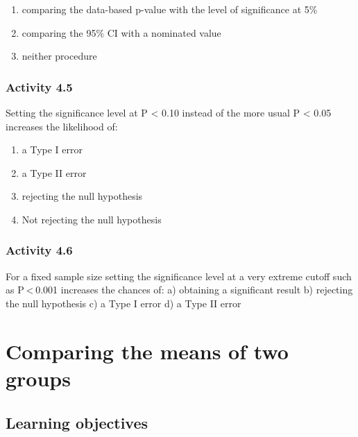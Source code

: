 \documentclass[
]{memoir}
\providecommand{\tightlist}{%
  \setlength{\itemsep}{0pt}\setlength{\parskip}{0pt}}
\begin{document}
\begin{enumerate}
\def\labelenumi{\alph{enumi})}
\tightlist
\item
  comparing the data-based p-value with the level of significance at 5\%
\item
  comparing the 95\% CI with a nominated value
\item
  neither procedure
\end{enumerate}

\hypertarget{activity-4.5}{%
\subsection{Activity 4.5}\label{activity-4.5}}

Setting the significance level at P \textless{} 0.10 instead of the more usual P \textless{} 0.05 increases the likelihood of:

\begin{enumerate}
\def\labelenumi{\alph{enumi})}
\tightlist
\item
  a Type I error
\item
  a Type II error
\item
  rejecting the null hypothesis
\item
  Not rejecting the null hypothesis
\end{enumerate}

\hypertarget{activity-4.6}{%
\subsection{Activity 4.6}\label{activity-4.6}}

For a fixed sample size setting the significance level at a very extreme cutoff such as P \textless{} 0.001 increases the chances of:
a) obtaining a significant result
b) rejecting the null hypothesis
c) a Type I error
d) a Type II error

\hypertarget{comparing-the-means-of-two-groups}{%
\chapter{Comparing the means of two groups}\label{comparing-the-means-of-two-groups}}

\hypertarget{learning-objectives-4}{%
\section*{Learning objectives}\label{learning-objectives-4}}
\end{document}

